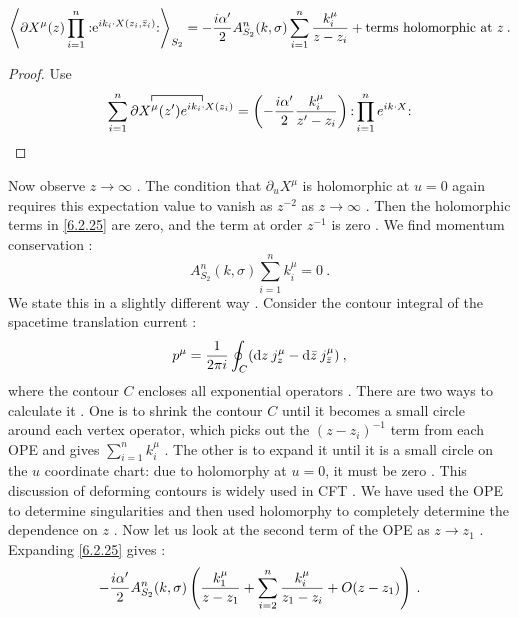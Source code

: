\begin{equation}
	\left\langle\partial X^{\mu}(z) \prod_{i=1}^{n}:\mathrel{\mathrm{e}^{i k_{i} \cdot X(z_{i}, \bar{z}_{i})}}:\right
	\rangle\bigg._{\!S_{2}}=-\frac{i \alpha^{\prime}}{2} A_{S_{2}}^{n}(k, \sigma) \sum_{i=1}^{n} \frac{k_{i}^{\mu}}{z-z_{i}} 
	+\text{terms holomorphic at } z \:. \label{6.2.25}
\end{equation}
\begin{tcolorbox}
	\begin{proof}
		Use
		\begin{equation}
		\sum_{i=1}^{n}\contraction{}{X^\mu(z')}{\,}{e^{i k_i \cdot X(z_i)}}\partial X^\mu(z') e^{i k_i \cdot X(z_i)}	= \left( - \frac{i \alpha'}{2} \frac{k_i^\mu}{z' - z_i} \right) \normal{\prod_{i=1}^{n} e^{ik \cdot X}}
		\end{equation}
	\end{proof}
\end{tcolorbox}
Now observe $z \rightarrow \infty$ . The condition that $\partial_{u} X^{\mu}$ is holomorphic at $u=0$ again requires this expectation value to vanish as $z^{-2}$ as $z \rightarrow \infty$ . Then the holomorphic terms in \eqref{6.2.25} are zero, and the term at order $z^{-1}$ is zero . We find momentum conservation :
\begin{equation}
	A_{S_{2}}^{n}(k, \sigma) \sum_{i=1}^{n} k_{i}^{\mu}=0 \:. \label{6.2.26}
\end{equation}
We state this in a slightly different way . Consider the contour integral of the spacetime translation current :
\begin{equation}
	p^{\mu}=\frac{1}{2 \pi i} \oint_{C}(\mathrm{d} z \: j_{z}^{\mu}-\mathrm{d} \bar{z}\: j_{\bar{z}}^{\mu}) \:, \label{6.2.27}
\end{equation}
where the contour $C$ encloses all exponential operators . There are two ways to calculate it . One is to shrink the contour $C$ until it becomes a small circle around each vertex operator, which picks out the $(z-z_{i})^{-1}$ term from each OPE and gives $\sum_{i=1}^{n} k_{i}^{\mu}$ . The other is to expand it until it is a small circle on the $u$ coordinate chart: due to holomorphy at $u=0$, it must be zero . This discussion of deforming contours is widely used in CFT . We have used the OPE to determine singularities and then used holomorphy to completely determine the dependence on $z$ . Now let us look at the second term of the OPE as $z \rightarrow z_{1}$ . Expanding \eqref{6.2.25} gives :
\begin{equation}
	-\frac{i \alpha^{\prime}}{2} A_{S_{2}}^{n}(k, \sigma)\left(\frac{k_{1}^{\mu}}{z-z_{1}}+\sum_{i=2}^{n} \frac{k_{i}^{\mu}}{z_{1}-z_{i}}+O(z-z_{1})\right) \:. \label{6.2.28}
\end{equation}
